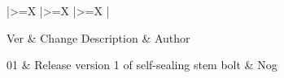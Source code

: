 \documentclass[a4paper,12pt]{article}
\theoremstyle{definition}
\def\arraystretch{1.5}%
\begin{document}
\bgroup

\small
\def\arraystretch{1.5}%
\begin{xltabular}{\textwidth}{
	|>{\hsize\linewidth=\hsize}X
	|>{\hsize\linewidth=\hsize}X
	|>{\hsize\linewidth=\hsize}X
	|
	}
	\hline


	Ver  &
	Change Description  &
	Author  \\ \hline \endhead

	01 & Release version 1 of self-sealing stem bolt & Nog \\ \hline

\end{xltabular}
\egroup
\end{document}
